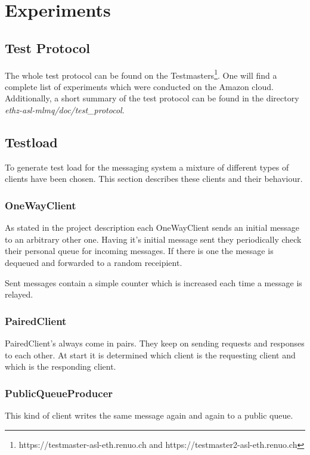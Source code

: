 \documentclass[milestone1.tex]{subfiles}
\begin{document}
\section{Experiments}




\subsection{Test Protocol}

The whole test protocol can be found on the Testmasters\footnote{https://testmaster-asl-eth.renuo.ch and https://testmaster2-asl-eth.renuo.ch}. One will find a complete list of experiments which were conducted on the Amazon cloud. Additionally, a short summary of the test protocol can be found in the directory \textit{ethz-asl-mlmq/doc/test\_protocol}.

\subsection{Testload}
To generate test load for the messaging system a mixture of different types of clients have been chosen. This section describes these clients and their behaviour.

\subsubsection{OneWayClient}
As stated in the project description each OneWayClient sends an initial message to an arbitrary other one. Having it's initial message sent they periodically check their personal queue for incoming messages. If there is one the message is dequeued and forwarded to a random receipient.

Sent messages contain a simple counter which is increased each time a message is relayed.

\subsubsection{PairedClient}
PairedClient's always come in pairs. They keep on sending requests and responses to each other. At start it is determined which client is the requesting client and which is the responding client.

\subsubsection{PublicQueueProducer}
This kind of client writes the same message again and again to a public queue.
\end{document}
